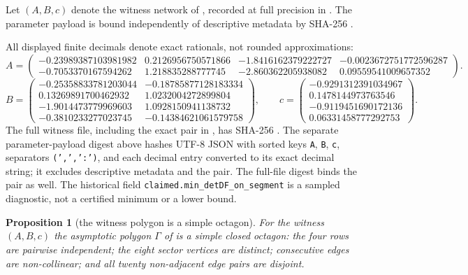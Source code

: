 \documentclass[11pt,twoside,leqno]{article}
\theoremstyle{plain}
\newtheorem{proposition}[proposition]{Proposition}
\theoremstyle{definition}
\theoremstyle{remark}
\begin{document}
Let $(A,B,c)$ denote the witness network of , recorded at
full precision in . The parameter payload is bound
independently of descriptive metadata by SHA-256
.

All displayed finite decimals denote exact rationals, not rounded approximations:
\begingroup\small\setlength{\arraycolsep}{3pt}
\[
A=\begin{pmatrix}-0.23989387103981982 & 0.2126956750571866 & -1.8416162379222727 & -0.0023672751772596287\\-0.7053370167594262 & 1.218835288777745 & -2.860362205938082 & 0.09559541009657352\end{pmatrix}.
\]
\[
B=\begin{pmatrix}-0.25358833781203044 & -0.18785877128183334\\0.13269891700462932 & 1.0232004272899804\\-1.9014473779969603 & 1.0928150941138732\\-0.3810233277023745 & -0.14384621061579758\end{pmatrix},\qquad
c=\begin{pmatrix}-0.9291312391034967\\0.1478144973763546\\-0.9119451690172136\\0.06331458777292753\end{pmatrix}.
\]
\endgroup
The full witness file, including the exact pair in , has SHA-256
.
The separate parameter-payload digest above hashes UTF-8 JSON with sorted keys
\texttt{A}, \texttt{B}, \texttt{c}, separators \texttt{(',',':')}, and each
decimal entry converted to its exact decimal string; it excludes descriptive
metadata and the pair. The full-file digest binds the pair as well.
The historical field \texttt{claimed.min\_detDF\_on\_segment} is a sampled
diagnostic, not a certified minimum or a lower bound.

\begin{proposition}[the witness polygon is a simple octagon]\label{prop:simple}
For the witness $(A,B,c)$ the asymptotic polygon $\Gamma$ of  is a simple closed octagon: the four rows are pairwise independent; the eight sector vertices are distinct; consecutive edges are non-collinear; and all twenty non-adjacent edge pairs are disjoint.
\end{proposition}
\end{document}
